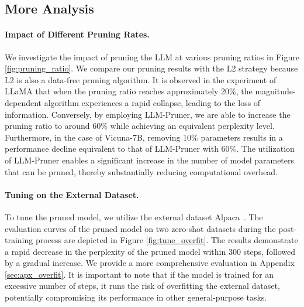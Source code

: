 \documentclass{article}
\begin{document}
\subsection{More Analysis}
\paragraph{Impact of Different Pruning Rates.} We investigate the impact of pruning the LLM at various pruning ratios in Figure \ref{fig:pruning_ratio}. We compare our pruning results with the L2 strategy because L2 is also a data-free pruning algorithm. It is observed in the experiment of LLaMA that when the pruning ratio reaches approximately 20\%, the magnitude-dependent algorithm experiences a rapid collapse, leading to the loss of information. Conversely, by employing LLM-Pruner, we are able to increase the pruning ratio to around 60\% while achieving an equivalent perplexity level. Furthermore, in the case of Vicuna-7B, removing 10\% parameters results in a performance decline equivalent to that of LLM-Pruner with 60\%. The utilization of LLM-Pruner enables a significant increase in the number of model parameters that can be pruned, thereby substantially reducing computational overhead.


\paragraph{Tuning on the External Dataset.} To tune the pruned model, we utilize the external dataset Alpaca~\cite{alpaca}. The evaluation curves of the pruned model on two zero-shot datasets during the post-training process are depicted in Figure \ref{fig:tune_overfit}. The results demonstrate a rapid decrease in the perplexity of the pruned model within 300 steps, followed by a gradual increase. We provide a more comprehensive evaluation in Appendix \ref{sec:apx_overfit}. It is important to note that if the model is trained for an excessive number of steps, it runs the risk of overfitting the external dataset, potentially compromising its performance in other general-purpose tasks.
\end{document}
